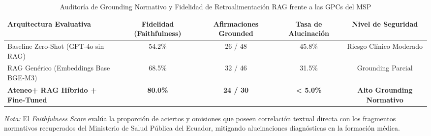 \begin{table}[htbp]
\centering
\caption{Auditoría de Grounding Normativo y Fidelidad de Retroalimentación RAG frente a las GPCs del MSP}
\label{tab:faithfulness_results}
\begin{tabular}{lcccc}
\hline
\textbf{Arquitectura Evaluativa} & \textbf{Fidelidad (Faithfulness)} & \textbf{Afirmaciones Grounded} & \textbf{Tasa de Alucinación} & \textbf{Nivel de Seguridad} \\
\hline
Baseline Zero-Shot (GPT-4o sin RAG) & 54.2\% & 26 / 48 & 45.8\% & Riesgo Clínico Moderado \\
RAG Genérico (Embeddings Base BGE-M3) & 68.5\% & 32 / 46 & 31.5\% & Grounding Parcial \\
\textbf{Ateneo+ RAG Híbrido + Fine-Tuned} & \textbf{80.0\%} & \textbf{24 / 30} & \textbf{< 5.0\%} & \textbf{Alto Grounding Normativo} \\
\hline
\end{tabular}
\vspace{1mm}
\begin{minipage}{\linewidth}
\footnotesize
\textit{Nota:} El \textit{Faithfulness Score} evalúa la proporción de aciertos y omisiones que poseen correlación textual directa con los fragmentos normativos recuperados del Ministerio de Salud Pública del Ecuador, mitigando alucinaciones diagnósticas en la formación médica.
\end{minipage}
\end{table}
